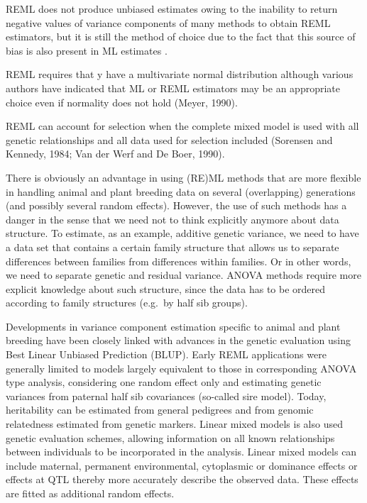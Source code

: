 \documentclass[
]{book}
\begin{document}
REML does not produce unbiased estimates owing to the inability to return negative values of variance components of many methods to obtain REML estimators, but it is still the method of choice due to the fact that this source of bias is also present in ML estimates \citep{LynchWalsh1998}.

REML requires that y have a multivariate normal distribution
although various authors have indicated that ML or REML estimators may be an
appropriate choice even if normality does not hold (Meyer, 1990).

REML can account for selection when the complete mixed model is used with
all genetic relationships and all data used for selection included (Sorensen and Kennedy,
1984; Van der Werf and De Boer, 1990).

There is obviously an advantage in using (RE)ML methods that are more flexible in
handling animal and plant breeding data on several (overlapping) generations (and possibly
several random effects). However, the use of such methods has a danger in the sense
that we need not to think explicitly anymore about data structure. To estimate, as an
example, additive genetic variance, we need to have a data set that contains a certain
family structure that allows us to separate differences between families from differences
within families. Or in other words, we need to separate genetic and residual variance.
ANOVA methods require more explicit knowledge about such structure, since the data
has to be ordered according to family structures (e.g.~by half sib groups).

Developments in variance component estimation specific to animal and plant breeding have been
closely linked with advances in the genetic evaluation using Best Linear
Unbiased Prediction (BLUP). Early REML applications were generally limited to models
largely equivalent to those in corresponding ANOVA type analysis, considering one
random effect only and estimating genetic variances from paternal half sib covariances
(so-called sire model). Today, heritability can be estimated from general pedigrees and from genomic relatedness estimated from genetic markers. Linear mixed models is also used genetic evaluation schemes,
allowing information on all known relationships between individuals to be incorporated in
the analysis. Linear mixed models can include maternal, permanent environmental, cytoplasmic or
dominance effects or effects at QTL thereby more accurately describe the observed data.
These effects are fitted as additional random effects.
\end{document}
